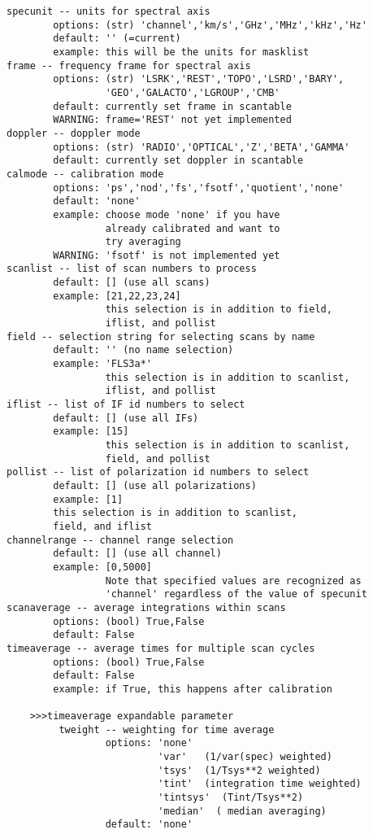 \begin{verbatim}
specunit -- units for spectral axis
        options: (str) 'channel','km/s','GHz','MHz','kHz','Hz'
        default: '' (=current)
        example: this will be the units for masklist
frame -- frequency frame for spectral axis
        options: (str) 'LSRK','REST','TOPO','LSRD','BARY',
                 'GEO','GALACTO','LGROUP','CMB'
        default: currently set frame in scantable
        WARNING: frame='REST' not yet implemented
doppler -- doppler mode
        options: (str) 'RADIO','OPTICAL','Z','BETA','GAMMA'
        default: currently set doppler in scantable
calmode -- calibration mode
        options: 'ps','nod','fs','fsotf','quotient','none'
        default: 'none'
        example: choose mode 'none' if you have
                 already calibrated and want to
                 try averaging
        WARNING: 'fsotf' is not implemented yet
scanlist -- list of scan numbers to process
        default: [] (use all scans)
        example: [21,22,23,24]
                 this selection is in addition to field,
                 iflist, and pollist
field -- selection string for selecting scans by name
        default: '' (no name selection)
        example: 'FLS3a*'
                 this selection is in addition to scanlist,
                 iflist, and pollist
iflist -- list of IF id numbers to select
        default: [] (use all IFs)
        example: [15]
                 this selection is in addition to scanlist,
                 field, and pollist
pollist -- list of polarization id numbers to select
        default: [] (use all polarizations)
        example: [1]
        this selection is in addition to scanlist,
        field, and iflist
channelrange -- channel range selection
        default: [] (use all channel)
        example: [0,5000]
                 Note that specified values are recognized as 
                 'channel' regardless of the value of specunit 
scanaverage -- average integrations within scans
        options: (bool) True,False
        default: False
timeaverage -- average times for multiple scan cycles
        options: (bool) True,False
        default: False
        example: if True, this happens after calibration

    >>>timeaverage expandable parameter
         tweight -- weighting for time average
                 options: 'none' 
                          'var'   (1/var(spec) weighted)
                          'tsys'  (1/Tsys**2 weighted)
                          'tint'  (integration time weighted)
                          'tintsys'  (Tint/Tsys**2)
                          'median'  ( median averaging)
                 default: 'none'


\end{verbatim}
